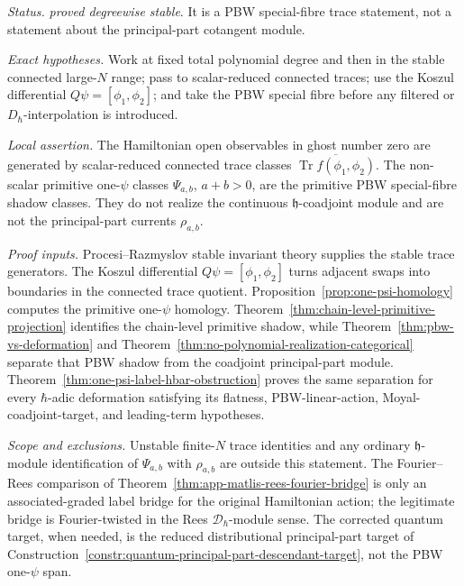 \begin{stmt}\label{thm:lane-stable-trace}
  \emph{Status.} \emph{proved degreewise stable}.  It is a PBW
  special-fibre trace statement, not a statement about the principal-part
  cotangent module.

  \emph{Exact hypotheses.} Work at fixed total polynomial degree and then
  in the stable connected large-\(N\) range; pass to scalar-reduced
  connected traces; use the Koszul differential
  \(Q\psi=[\phi_1,\phi_2]\); and take the PBW special fibre before any
  filtered or \(D_\hbar\)-interpolation is introduced.

  \emph{Local assertion.} The Hamiltonian open observables in ghost
  number zero are generated by scalar-reduced connected trace classes
  \(\overline{\operatorname{Tr} f(\phi_1,\phi_2)}\).  The non-scalar
  primitive one-\(\psi\) classes \(\Psi_{a,b}\), \(a+b>0\), are the primitive PBW
  special-fibre shadow classes.  They do not realize the continuous
  \(\mathfrak h\)-coadjoint module and are not the principal-part
  currents \(\rho_{a,b}\).

  \emph{Proof inputs.}
  Procesi--Razmyslov stable invariant theory supplies the stable trace
  generators.  The Koszul differential \(Q\psi=[\phi_1,\phi_2]\) turns
  adjacent swaps into boundaries in the connected trace quotient.
  Proposition~\ref{prop:one-psi-homology} computes the primitive
  one-\(\psi\) homology.  Theorem~\ref{thm:chain-level-primitive-projection}
  identifies the chain-level primitive shadow, while
  Theorem~\ref{thm:pbw-vs-deformation} and
  Theorem~\ref{thm:no-polynomial-realization-categorical} separate that
  PBW shadow from the coadjoint principal-part module.
  Theorem~\ref{thm:one-psi-label-hbar-obstruction} proves the
  same separation for every \(\hbar\)-adic deformation satisfying its
  flatness, PBW-linear-action, Moyal-coadjoint-target, and leading-term
  hypotheses.

  \emph{Scope and exclusions.} Unstable finite-\(N\) trace identities and any
  ordinary \(\mathfrak h\)-module identification of
  \(\Psi_{a,b}\) with \(\rho_{a,b}\) are outside this statement.  The
  Fourier--Rees comparison of
  Theorem~\ref{thm:app-matlis-rees-fourier-bridge} is only an
  associated-graded label bridge for the original Hamiltonian action; the
  legitimate bridge is Fourier-twisted in the Rees
  \(\mathcal D_\hbar\)-module sense.  The corrected quantum target, when
  needed, is the reduced distributional principal-part target of
  Construction~\ref{constr:quantum-principal-part-descendant-target},
  not the PBW one-\(\psi\) span.
\end{stmt}

